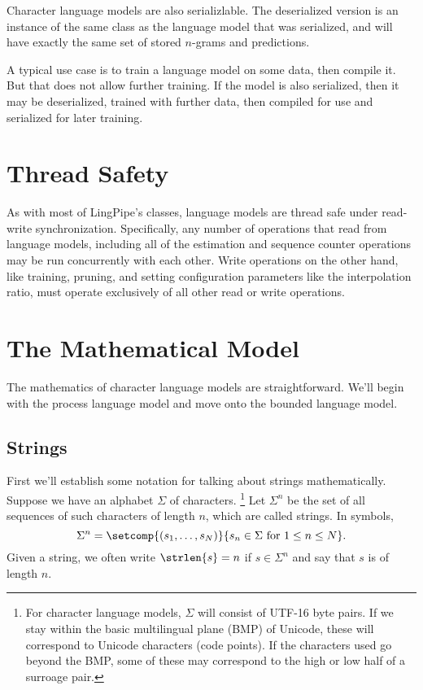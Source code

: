 Character language models are also serializlable.   The deserialized
version is an instance of the same class as the language model that
was serialized, and will have exactly the same set of stored $n$-grams
and predictions.  

A typical use case is to train a language model on some data, then
compile it.  But that does not allow further training.  If the model
is also serialized, then it may be deserialized, trained with further
data, then compiled for use and serialized for later training.


\section{Thread Safety}

As with most of LingPipe's classes, language models are thread safe
under read-write synchronization.  Specifically, any number of
operations that read from language models, including all of the
estimation and sequence counter operations may be run concurrently
with each other. Write operations on the other hand, like training,
pruning, and setting configuration parameters like the interpolation
ratio, must operate exclusively of all other read or write operations.



\section{The Mathematical Model}\label{section:char-lm-math}

The mathematics of character language models are straightforward.
We'll begin with the process language model and move onto the
bounded language model.

\subsection{Strings}

First we'll establish some notation for talking about strings
mathematically.  Suppose we have an alphabet $\Sigma$ of characters.%
%
\footnote{For character language models, $\Sigma$ will consist of
  UTF-16 byte pairs.  If we stay within the basic multilingual plane
  (BMP) of Unicode, these will correspond to Unicode characters (code
  points).  If the characters used go beyond the BMP, some of these
  may correspond to the high or low half of a surroage pair.}
%
Let $\Sigma^n$ be the set of all sequences of such characters of
length $n$, which are called strings.  In symbols,
%
\begin{equation}
\Sigma^n = \setcomp{(s_1,\ldots,s_N)}{s_n \in \Sigma \mbox{ for } 1 \leq n \leq N}.
\end{equation}
%
Given a string, we often write $\strlen{s} = n$ if $s \in \Sigma^n$ and
say that $s$ is of length $n$.

